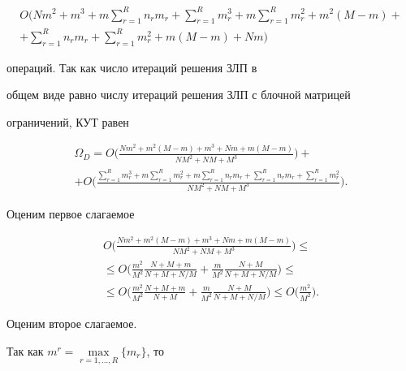 \begin{pf}
\begin{multline*}


O\bigg(Nm^2+m^3+m\sum_{r=1}^Rn_rm_r+


\sum_{r=1}^Rm_r^3+m\sum_{r=1}^Rm_r^2+m^2(M-m)+ \\


+\sum_{r=1}^Rn_rm_r+\sum_{r=1}^Rm_r^2+m(M-m)+Nm\bigg)


\end{multline*}


операций. Так как число итераций решения ЗЛП в


общем виде равно числу итераций решения ЗЛП с блочной матрицей


ограничений, КУТ равен


\begin{multline}\label{eq23}


\Omega_D = O\bigg(\frac{Nm^2+m^2(M-m)+m^3+Nm+m(M-m)}


{NM^2+NM+M^3}\bigg)+ \\


+O\bigg(\frac{\sum\limits_{r=1}^Rm_r^3+m\sum\limits_{r=1}^Rm_r^2+


m\sum\limits_{r=1}^Rn_rm_r+


\sum\limits_{r=1}^Rn_rm_r+\sum\limits_{r=1}^Rm_r^2}


{NM^2+NM+M^3}\bigg).


\end{multline}


Оценим первое слагаемое


\begin{multline*}


O\bigg(\frac{Nm^2+m^2(M-m)+m^3+Nm+m(M-m)}


{NM^2+NM+M^3}\bigg) \leq \\


\leq O\bigg(\frac{m^2}{M^2}\frac{N+M+m}{N+M+N/M} +


\frac{m}{M^2}\frac{N+M}{N+M+N/M}\bigg) \leq \\


\leq O\bigg(\frac{m^2}{M^2}\frac{N+M+m}{N+M} +


\frac{m}{M^2}\frac{N+M}{N+M+N/M}\bigg)


\leq O\bigg(\frac{m^2}{M^2}\bigg).


\end{multline*}


Оценим второе слагаемое.


Так как $m^r = \max\limits_{r=1,\dotsc,R}\{m_r\}$, то


\begin{multline*}



\end{multline*}
\end{pf}
